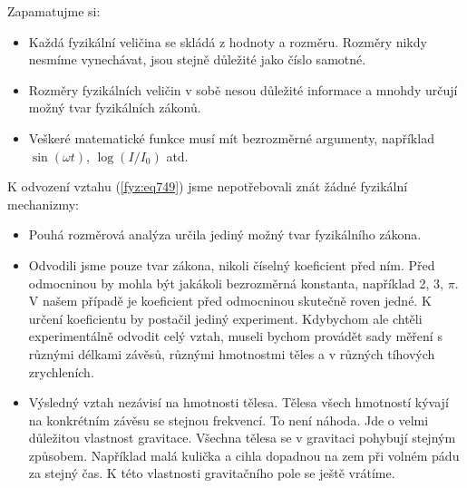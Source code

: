     

    \begin{tcnote}      
      Zapamatujme si:
      \begin{itemize}[leftmargin=10pt, noitemsep]
        \item Každá fyzikální veličina se skládá z hodnoty a rozměru. Rozměry nikdy nesmíme
              vynechávat, jsou stejně důležité jako číslo samotné.
        \item Rozměry fyzikálních veličin v sobě nesou důležité informace a mnohdy určují možný tvar
              fyzikálních zákonů.
        \item Veškeré matematické funkce musí mít bezrozměrné argumenty, například \(\sin(ωt)\),
              \(\log(I/I_0)\) atd.
      \end{itemize}
    \end{tcnote}

    
    \begin{tcnote}
      K odvození vztahu (\ref{fyz:eq749}) jsme nepotřebovali znát žádné fyzikální mechanizmy:
      \begin{itemize}[leftmargin=10pt, noitemsep]
        \item Pouhá rozměrová analýza určila jediný možný tvar fyzikálního zákona.
        \item Odvodili jsme pouze tvar zákona, nikoli číselný koeficient před ním. Před odmocninou
              by mohla být jakákoli bezrozměrná konstanta, například \num{2}, \num{3}, \(π\). V
              našem případě je koeficient před odmocninou skutečně roven jedné. K určení koeficientu
              by postačil jediný experiment. Kdybychom ale chtěli experimentálně odvodit celý vztah,
              museli bychom provádět sady měření s různými délkami závěsů, různými hmotnostmi těles
              a v různých tíhových zrychleních.
        \item Výsledný vztah nezávisí na hmotnosti tělesa. Tělesa všech hmotností kývají na
              konkrétním závěsu se stejnou frekvencí. To není náhoda. Jde o velmi důležitou
              vlastnost gravitace. Všechna tělesa se v gravitaci pohybují stejným způsobem.
              Například malá kulička a cihla dopadnou na zem při volném pádu za stejný čas. K této
              vlastnosti gravitačního pole se ještě vrátíme. 
      \end{itemize}
    \end{tcnote}

